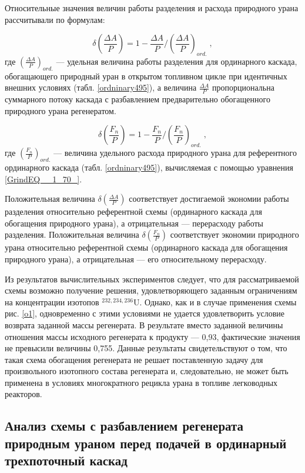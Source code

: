 Относительные значения величин работы разделения и расхода природного урана рассчитывали по формулам:

\begin{equation} \label{DeltaA} 
  \delta(\frac{\Delta A}{P})=1-\frac{\Delta A}{P}/(\frac{\Delta A}{P})_{ord.} \; ,
\end{equation}
где $(\frac{\Delta A}{P})_{ord.}$ --- удельная величина работы разделения для ординарного каскада, обогащающего природный уран в открытом топливном цикле при идентичных внешних условиях (табл. \ref{ordninary495}), а величина $\frac{\Delta A}{P}$ пропорциональна суммарного потоку каскада с разбавлением предварительно обогащенного природного урана регенератом.

\begin{equation} \label{DeltaFnu} 
  \delta(\frac{F_n}{P})=1-\frac{F_n}{P}/(\frac{F_n}{P})_{ord.} \; ,
\end{equation} 
где $(\frac{F_n}{P})_{ord.}$ --- величина удельного расхода природного урана для референтного ординарного каскада (табл. \ref{ordninary495}), вычисляемая с помощью уравнения \ref{GrindEQ__1_70_}.

Положительная величина $\delta(\frac{\Delta A}{P})$ соответствует достигаемой экономии работы разделения относительно референтной схемы (ординарного каскада для обогащения природного урана), а отрицательная --- перерасходу работы разделения. Положительная величина $\delta(\frac{F_n}{P})$ соответствует экономии природного урана относительно референтной схемы (ординарного каскада для обогащения природного урана), а отрицательная --- его относительному перерасходу.


Из результатов вычислительных экспериментов следует, что для рассматриваемой схемы возможно получение решения, удовлетворяющего заданным ограничениям на концентрации изотопов $^{232,234,236}$U. Однако, как и в случае применения схемы рис. \ref{o1}, одновременно с этими условиями не удается удовлетворить условие возврата заданной массы регенерата. В результате вместо заданной величины отношения массы исходного регенерата к продукту --- 0,93, фактические значения не превысили величины 0,755. Данные результаты свидетельствуют о том, что такая схема обогащения регенерата не решает поставленную задачу для произвольного изотопного состава регенерата и, следовательно, не может быть применена в условиях многократного рецикла урана в топливе легководных реакторов.


\subsection{Анализ схемы с разбавлением регенерата природным ураном перед подачей в ординарный трехпоточный каскад}

